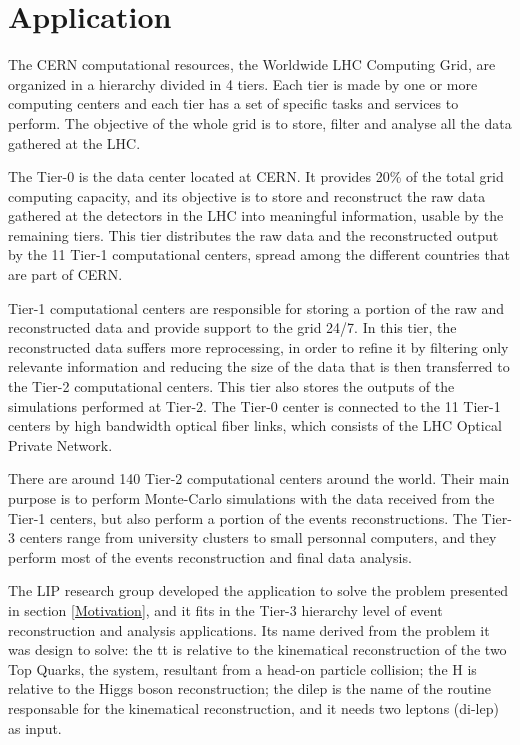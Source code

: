 \chapter{\tth Application}
\label{Application}

The CERN computational resources, the Worldwide LHC Computing Grid, are organized in a hierarchy divided in 4 tiers. Each tier is made by one or more computing centers and each tier has a set of specific tasks and services to perform. The objective of the whole grid is to store, filter and analyse all the data gathered at the LHC.

The Tier-0 is the data center located at CERN. It provides 20\% of the total grid computing capacity, and its objective is to store and reconstruct the raw data gathered at the detectors in the LHC into meaningful information, usable by the remaining tiers. This tier distributes the raw data and the reconstructed output by the 11 Tier-1 computational centers, spread among the different countries that are part of CERN.

Tier-1 computational centers are responsible for storing a portion of the raw and reconstructed data and provide support to the grid 24/7. In this tier, the reconstructed data suffers more reprocessing, in order to refine it by filtering only relevante information and reducing the size of the data that is then transferred to the Tier-2 computational centers. This tier also stores the outputs of the simulations performed at Tier-2. The Tier-0 center is connected to the 11 Tier-1 centers by high bandwidth optical fiber links, which consists of the LHC Optical Private Network.

There are around 140 Tier-2 computational centers around the world. Their main purpose is to perform Monte-Carlo simulations with the data received from the Tier-1 centers, but also perform a portion of the events reconstructions. The Tier-3 centers range from university clusters to small personnal computers, and they perform most of the events reconstruction and final data analysis.

The LIP research group developed the \tth application to solve the problem presented in section \ref{Motivation}, and it fits in the Tier-3 hierarchy level of event reconstruction and analysis applications. Its name derived from the problem it was design to solve: the tt is relative to the kinematical reconstruction of the two Top Quarks, the \ttbar system, resultant from a head-on particle collision; the H is relative to the Higgs boson reconstruction; the dilep is the name of the routine responsable for the kinematical reconstruction, and it needs two leptons (di-lep) as input.

